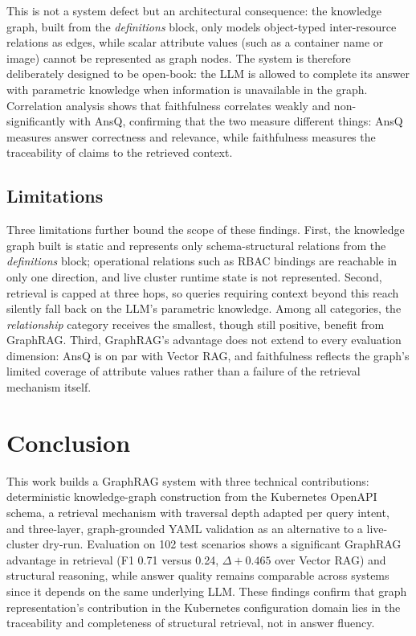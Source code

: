 \documentclass{ieeeaccess}
\begin{document}
This is not a system defect but an architectural consequence: the knowledge graph, built from the \textit{definitions} block, only models object-typed inter-resource relations as edges, while scalar attribute values (such as a container name or image) cannot be represented as graph nodes. The system is therefore deliberately designed to be open-book: the LLM is allowed to complete its answer with parametric knowledge when information is unavailable in the graph. Correlation analysis shows that faithfulness correlates weakly and non-significantly with AnsQ, confirming that the two measure different things: AnsQ measures answer correctness and relevance, while faithfulness measures the traceability of claims to the retrieved context.

\subsection{Limitations}

Three limitations further bound the scope of these findings. First, the knowledge graph built is static and represents only schema-structural relations from the \textit{definitions} block; operational relations such as RBAC bindings are reachable in only one direction, and live cluster runtime state is not represented. Second, retrieval is capped at three hops, so queries requiring context beyond this reach silently fall back on the LLM's parametric knowledge. Among all categories, the \textit{relationship} category receives the smallest, though still positive, benefit from GraphRAG. Third, GraphRAG's advantage does not extend to every evaluation dimension: AnsQ is on par with Vector RAG, and faithfulness reflects the graph's limited coverage of attribute values rather than a failure of the retrieval mechanism itself.

\section{Conclusion}
\label{sec:kesimpulan}

This work builds a GraphRAG system with three technical contributions: deterministic knowledge-graph construction from the Kubernetes OpenAPI schema, a retrieval mechanism with traversal depth adapted per query intent, and three-layer, graph-grounded YAML validation as an alternative to a live-cluster dry-run. Evaluation on 102 test scenarios shows a significant GraphRAG advantage in retrieval (F1 0.71 versus 0.24, $\Delta{+}0.465$ over Vector RAG) and structural reasoning, while answer quality remains comparable across systems since it depends on the same underlying LLM. These findings confirm that graph representation's contribution in the Kubernetes configuration domain lies in the traceability and completeness of structural retrieval, not in answer fluency.
\end{document}
